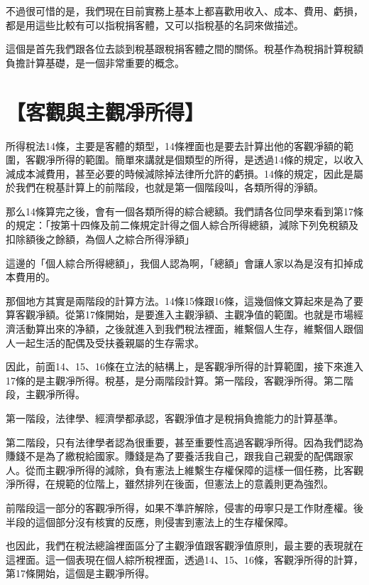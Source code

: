 \documentclass[]{ctexbook}
\begin{document}
不過很可惜的是，我們現在目前實務上基本上都喜歡用收入、成本、費用、虧損，都是用這些比較有可以指稅捐客體，又可以指稅基的名詞來做描述。

這個是首先我們跟各位去談到稅基跟稅捐客體之間的關係。稅基作為稅捐計算稅額負擔計算基礎，是一個非常重要的概念。

\hypertarget{ux5ba2ux89c0ux8207ux4e3bux89c0ux51c8ux6240ux5f97}{%
\section{【客觀與主觀凈所得】}\label{ux5ba2ux89c0ux8207ux4e3bux89c0ux51c8ux6240ux5f97}}

所得稅法14條，主要是客體的類型，14條裡面也是要去計算出他的客觀凈額的範圍，客觀凈所得的範圍。簡單來講就是個類型的所得，是透過14條的規定，以收入減成本減費用，甚至必要的時候減除掉法律所允許的虧損。14條的規定，因此是屬於我們在稅基計算上的前階段，也就是第一個階段叫，各類所得的淨額。

那么14條算完之後，會有一個各類所得的綜合總額。我們請各位同學來看到第17條的規定：「按第十四條及前二條規定計得之個人綜合所得總額，減除下列免稅額及扣除額後之餘額，為個人之綜合所得淨額」

這邊的「個人綜合所得總額」，我個人認為啊，「總額」會讓人家以為是沒有扣掉成本費用的。

那個地方其實是兩階段的計算方法。14條15條跟16條，這幾個條文算起來是為了要算客觀凈額。從第17條開始，是要進入主觀淨額、主觀净值的範圍。也就是市場經濟活動算出來的净額，之後就進入到我們稅法裡面，維繫個人生存，維繫個人跟個人一起生活的配偶及受扶養親屬的生存需求。

因此，前面14、15、16條在立法的結構上，是客觀凈所得的計算範圍，接下來進入17條的是主觀凈所得。稅基，是分兩階段計算。第一階段，客觀淨所得。第二階段，主觀凈所得。

第一階段，法律學、經濟學都承認，客觀淨值才是稅捐負擔能力的計算基準。

第二階段，只有法律學者認為很重要，甚至重要性高過客觀凈所得。因為我們認為賺錢不是為了繳稅給國家。賺錢是為了要養活我自己，跟我自己親愛的配偶跟家人。從而主觀凈所得的減除，負有憲法上維繫生存權保障的這樣一個任務，比客觀淨所得，在規範的位階上，雖然排列在後面，但憲法上的意義則更為強烈。

前階段這一部分的客觀凈所得，如果不準許解除，侵害的毋寧只是工作財產權。後半段的這個部分沒有核實的反應，則侵害到憲法上的生存權保障。

也因此，我們在稅法總論裡面區分了主觀淨值跟客觀淨值原則，最主要的表現就在這裡面。這一個表現在個人綜所稅裡面，透過14、15、16條，客觀淨所得的計算，第17條開始，這個是主觀凈所得。
\end{document}
